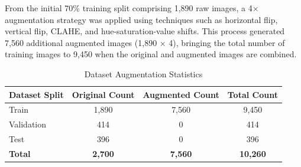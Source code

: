 From the initial 70\% training split comprising 1,890 raw images, a 4× augmentation strategy was applied using techniques such as horizontal flip, vertical flip, CLAHE, and hue-saturation-value shifts. This process generated 7,560 additional augmented images (1,890 × 4), bringing the total number of training images to 9,450 when the original and augmented images are combined.

\begin{table}[H]
\centering
\caption{Dataset Augmentation Statistics}
\label{tab:augmentation_stats}
\begin{tabular}{|l|c|c|c|}
\hline
\textbf{Dataset Split} & \textbf{Original Count} & \textbf{Augmented Count} & \textbf{Total Count} \\
\hline
Train & 1,890 & 7,560 & 9,450 \\
Validation & 414 & 0 & 414 \\
Test & 396 & 0 & 396 \\
\hline
\textbf{Total} & \textbf{2,700} & \textbf{7,560} & \textbf{10,260} \\
\hline
\end{tabular}
\end{table}


